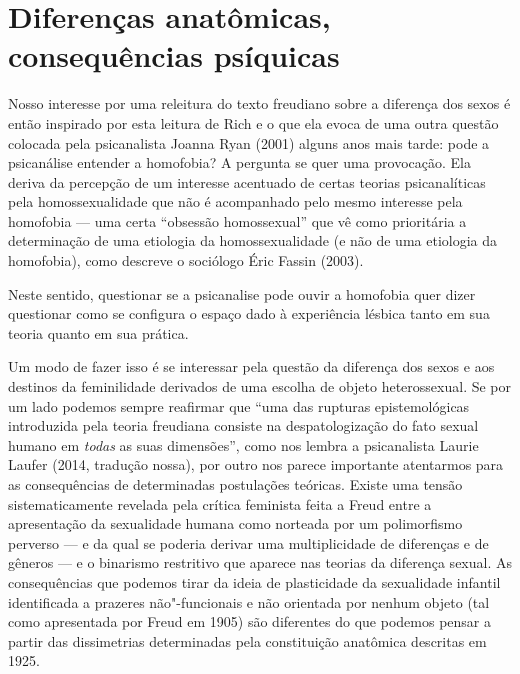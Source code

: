 \section{Diferenças anatômicas, consequências psíquicas}

Nosso interesse por uma releitura do texto freudiano sobre a diferença
dos sexos é então inspirado por esta leitura de Rich e o que ela evoca
de uma outra questão colocada pela psicanalista Joanna Ryan (2001) alguns anos
mais tarde: pode a psicanálise entender a homofobia? A pergunta se quer uma
provocação. Ela deriva da percepção de um interesse acentuado de certas
teorias psicanalíticas pela homossexualidade que não é acompanhado pelo
mesmo interesse pela homofobia --- uma certa ``obsessão homossexual'' que
vê como prioritária a determinação de uma etiologia da homossexualidade
(e não de uma etiologia da homofobia), como descreve o sociólogo Éric
Fassin (2003).

Neste sentido, questionar se a psicanalise pode ouvir a homofobia quer
dizer questionar como se configura o espaço dado à experiência lésbica
tanto em sua teoria quanto em sua prática.

Um modo de fazer isso é se interessar pela questão da diferença dos
sexos e aos destinos da feminilidade derivados de uma escolha de objeto
heterossexual. Se por um lado podemos sempre reafirmar que ``uma das
rupturas epistemológicas introduzida pela teoria freudiana consiste na
despatologização do fato sexual humano em \emph{todas} as suas
dimensões'', como nos lembra a psicanalista Laurie Laufer (2014, tradução nossa), por outro nos parece importante atentarmos para
as consequências de determinadas postulações teóricas. Existe uma tensão
sistematicamente revelada pela crítica feminista feita a Freud entre a
apresentação da sexualidade humana como norteada por um polimorfismo
perverso --- e da qual se poderia derivar uma multiplicidade de
diferenças e de gêneros --- e o binarismo restritivo que aparece nas
teorias da diferença sexual. As consequências que podemos tirar da ideia
de plasticidade da sexualidade infantil identificada a prazeres
não"-funcionais e não orientada por nenhum objeto (tal como apresentada
por Freud em 1905) são diferentes do que podemos pensar a partir das
dissimetrias determinadas pela constituição anatômica descritas em 1925.

